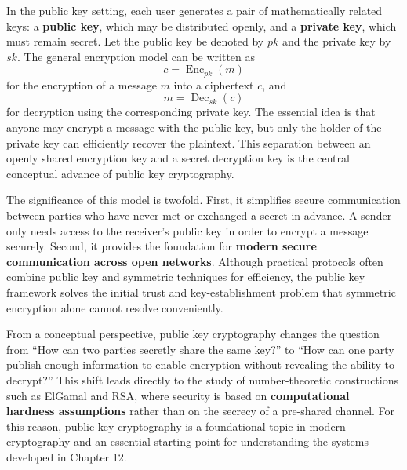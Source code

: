 In the public key setting, each user generates a pair of mathematically related keys: a \textbf{public key}, which may be distributed openly, and a \textbf{private key}, which must remain secret. Let the public key be denoted by $pk$ and the private key by $sk$. The general encryption model can be written as
\[
c = \operatorname{Enc}_{pk}(m)
\]
for the encryption of a message $m$ into a ciphertext $c$, and
\[
m = \operatorname{Dec}_{sk}(c)
\]
for decryption using the corresponding private key. The essential idea is that anyone may encrypt a message with the public key, but only the holder of the private key can efficiently recover the plaintext. This separation between an openly shared encryption key and a secret decryption key is the central conceptual advance of public key cryptography.

The significance of this model is twofold. First, it simplifies secure communication between parties who have never met or exchanged a secret in advance. A sender only needs access to the receiver's public key in order to encrypt a message securely. Second, it provides the foundation for \textbf{modern secure communication across open networks}. Although practical protocols often combine public key and symmetric techniques for efficiency, the public key framework solves the initial trust and key-establishment problem that symmetric encryption alone cannot resolve conveniently.

From a conceptual perspective, public key cryptography changes the question from ``How can two parties secretly share the same key?'' to ``How can one party publish enough information to enable encryption without revealing the ability to decrypt?'' This shift leads directly to the study of number-theoretic constructions such as ElGamal and RSA, where security is based on \textbf{computational hardness assumptions} rather than on the secrecy of a pre-shared channel. For this reason, public key cryptography is a foundational topic in modern cryptography and an essential starting point for understanding the systems developed in Chapter 12.
